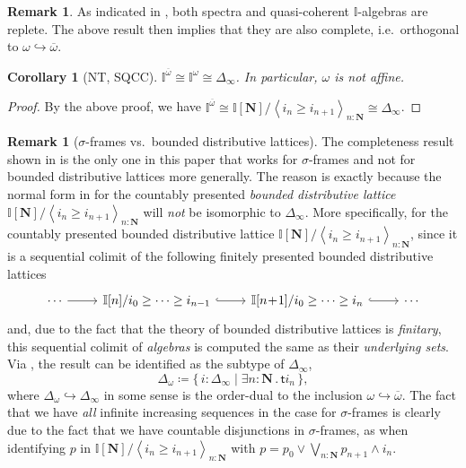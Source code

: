 \documentclass[a4paper,12pt]{amsart}
\newtheorem{corollary}[theorem]{Corollary}
\theoremstyle{definition}
\newtheorem{remark}[theorem]{Remark}
\newcommand{\mb}[1]{\mathbf{#1}}
\newcommand{\mbb}[1]{\mathbb{#1}}
\newcommand{\I}{\mbb I}
\newcommand{\ms}[1]{\mathsf{#1}}
\newcommand{\ov}[1]{\overline{#1}}
\newcommand{\pair}[1]{\left\langle#1\right\rangle}
\newcommand{\scomp}[2]{\{\,#1\mid#2\,\}}
\newcommand{\hook}{\hookrightarrow}
\newcommand{\N}{\mb N}
\newcommand{\ex}[2]{\exists #1\!\colon\!\!#2\mathpunct{.}}
\begin{document}
\begin{remark}
  As indicated in , both spectra and quasi-coherent $\I$-algebras are replete. The above result then implies that they are also complete, i.e.\ orthogonal to $\omega\hook\ov\omega$.
\end{remark}

\begin{corollary}[NT, SQCC]
  $\I^{\ov\omega} \cong \I^\omega \cong \Delta_\infty$. In particular, $\omega$ is not affine.
\end{corollary}
\begin{proof}
  By the above proof, we have $\I^{\ov\omega} \cong \I[\N]/\pair{i_n \ge i_{n+1}}_{n:\N} \cong \Delta_\infty$.
\end{proof}

\begin{remark}[$\sigma$-frames vs.\ bounded distributive lattices]\label{rem:whynotdis}
  The completeness result shown in  is the only one in this paper that works for $\sigma$-frames and not for bounded distributive lattices more generally. The reason is exactly because the normal form in  for the countably presented \emph{bounded distributive lattice} $\I[\N]/\pair{i_n \ge i_{n+1}}_{n:\N}$ will \emph{not} be isomorphic to $\Delta_\infty$. More specifically, for the countably presented bounded distributive lattice $\I[\N]/\pair{i_n \ge i_{n+1}}_{n:\N}$, since it is a sequential colimit of the following finitely presented bounded distributive lattices
  \[ 
  \begin{tikzcd}
    \cdots \ar[r] & \I[n]/i_{0} \ge \cdots \ge i_{n-1} \ar[r, hook] & \I[n\!+\!1]/i_0 \ge \cdots \ge i_n \ar[r, hook] & \cdots
  \end{tikzcd}
  \]
  and, due to the fact that the theory of bounded distributive lattices is \emph{finitary}, this sequential colimit of \emph{algebras} is computed the same as their \emph{underlying sets}. Via , the result can be identified as the subtype of $\Delta_\infty$,
  \[ \Delta_\omega \coloneq \scomp{i : \Delta_\infty}{\ex n\N \ms ti_n}, \]
  where $\Delta_\omega \hook \Delta_\infty$ in some sense is the order-dual to the inclusion $\omega\hook\ov\omega$. The fact that we have \emph{all} infinite increasing sequences in the case for $\sigma$-frames is clearly due to the fact that we have countable disjunctions in $\sigma$-frames, as when identifying $p$ in $\I[\N]/\pair{i_n \ge i_{n+1}}_{n:\N}$ with $p = p_0 \vee \bigvee_{n:\N}p_{n+1}\wedge i_n$.
\end{remark}
\end{document}
